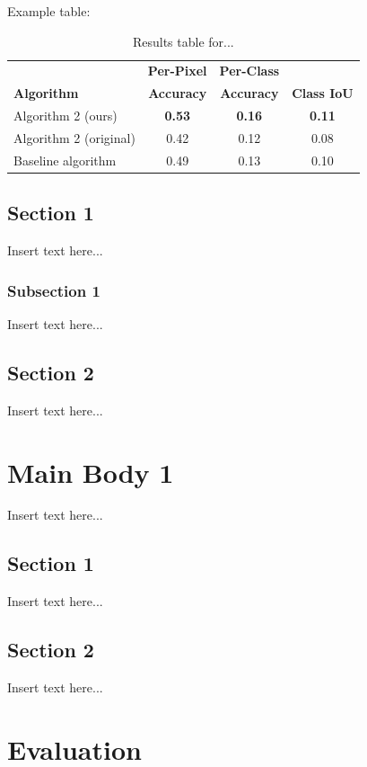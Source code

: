 \documentclass[12pt]{report} %
\begin{document}
Example table:
\begin{table}[h]
\begin{tabular}{l | c c c}
& \textbf{Per-Pixel} & \textbf{Per-Class} &\\
\textbf{Algorithm} & \textbf{Accuracy} & \textbf{Accuracy} & \textbf{Class IoU}\\\hline
Algorithm 2 (ours) & \textbf{0.53} & \textbf{0.16} & \textbf{0.11} \\
Algorithm 2 (original) & 0.42 & 0.12 & 0.08 \\
Baseline algorithm & 0.49 & 0.13 & 0.10 \\
\end{tabular}
\label{tab:tablelabel}
\caption{Results table for...}
\end{table}

\section{Section 1}

Insert text here...

\subsection{Subsection 1}

Insert text here...

\section{Section 2}

Insert text here...

\chapter{Main Body 1}

Insert text here...

\section{Section 1}

Insert text here...

\section{Section 2}

Insert text here...

\chapter{Evaluation}
\end{document}
